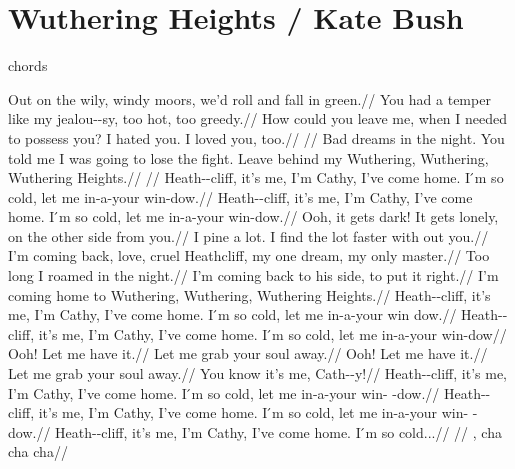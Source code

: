\section{Wuthering Heights / Kate Bush}\label{sec:wuthering_heights}
  {\small chords}
  
  \Fmajor
  \Emajor
  \CsharpMajor
  \AflatMajor
  \Dminor
  \Gmajor
  \Cmajor
  
   Out on the wily,  windy moors, we’d  roll and
  fall in  green.//
   You had a temper  like my jealou--sy, too hot,
  too  greedy.//
   How could you leave me,  when I needed to 
  possess you?  I hated you.  I loved you, too.//
  //
   Bad dreams in the  night.  You told me I was
   going to lose the fight.  Leave behind my 
  Wuthering, Wuthering, Wuthering Heights.//
  //
  Heath--cliff,  it’s  me, I’m Cathy, I’ve come
   home.  I ́m so cold, let me  in-a-your  win-dow.//
  Heath--cliff,  it’s  me, I’m Cathy, I’ve come
   home.  I ́m so cold, let me  in-a-your  win-dow.//
   Ooh, it gets dark!  It gets lonely,  on the
  other  side from you.//
   I pine a lot.  I find the lot  faster with 
  out you.//
   I’m coming back, love,  cruel Heathcliff,  my
  one dream,  my only  master.//
   Too long I  roamed in the night.//
   I’m coming back to his  side, to put it right.//
   I’m coming home to  Wuthering, Wuthering,
  Wuthering Heights.//
  Heath--cliff,  it’s  me, I’m Cathy, I’ve come
   home.  I ́m so cold, let me  in-a-your  win dow.//
  Heath--cliff,  it’s  me, I’m Cathy, I’ve come
   home.  I ́m so cold, let me  in-a-your  win-dow//
   Ooh! Let me  have it.//
  Let me  grab your  soul away.//
   Ooh! Let me  have it.//
  Let me  grab your  soul away.//
   You know it’s  me, Cath--y!//
  Heath--cliff,  it’s  me, I’m Cathy, I’ve come
   home.  I ́m so cold, let me  in-a-your  win-
  -dow.//
  Heath--cliff,  it’s  me, I’m Cathy, I’ve come
   home.  I ́m so cold, let me  in-a-your  win-
  -dow.//
  Heath--cliff,  it’s  me, I’m Cathy, I’ve come
   home.  I ́m so cold...//
   //
    , cha cha cha//
